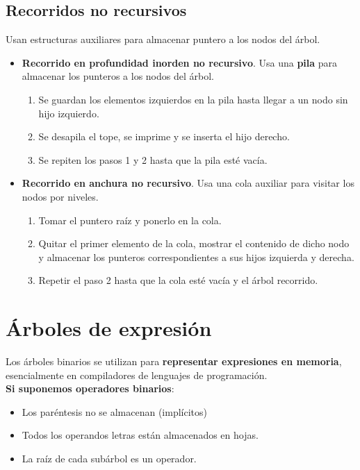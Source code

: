 \documentclass{article}
\begin{document}
\subsection{Recorridos no recursivos}
Usan estructuras auxiliares para almacenar puntero a los nodos del árbol.
\begin{itemize}
    \item \textbf{Recorrido en profundidad inorden no recursivo}. Usa una \textbf{pila} para almacenar los punteros a los nodos del árbol.
    \begin{enumerate}
        \item Se guardan los elementos izquierdos en la pila hasta llegar a un nodo sin hijo izquierdo.

        \item Se desapila el tope, se imprime y se inserta el hijo derecho.

        \item Se repiten los pasos 1 y 2 hasta que la pila esté vacía.
    \end{enumerate}

    \item \textbf{Recorrido en anchura no recursivo}. Usa una cola auxiliar para visitar los nodos por niveles.
    \begin{enumerate}
        \item Tomar el puntero raíz y ponerlo en la cola.

        \item Quitar el primer elemento de la cola, mostrar el contenido de dicho nodo y almacenar los punteros correspondientes a sus hijos izquierda y derecha.

        \item Repetir el paso 2 hasta que la cola esté vacía y el árbol recorrido.
    \end{enumerate}
\end{itemize}

\section{Árboles de expresión}
Los árboles binarios se utilizan para \textbf{representar expresiones en memoria}, esencialmente en compiladores de lenguajes de programación. \\

\textbf{Si suponemos operadores binarios}:
\begin{itemize}
    \item Los paréntesis no se almacenan (implícitos)
    \item Todos los operandos letras están almacenados en hojas.
    \item La raíz de cada subárbol es un operador.
\end{itemize}
\end{document}
